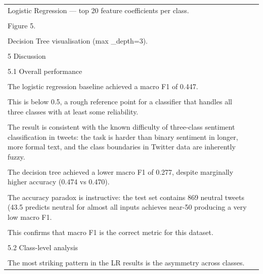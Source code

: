 \documentclass[11pt]{article}
\begin{document}
\begin{longtable}{|p{}|p{}|}
\hline
\rule{0pt}{3.5cm} & \\
\hline
Logistic Regression --- top 20 feature coefficients per class. & \\[2pt]
\hline
\rule{0pt}{3.5cm} & \\
\hline
Figure 5. & \\[2pt]
\hline
\rule{0pt}{3.5cm} & \\
\hline
Decision Tree visualisation (max \_depth=3). & \\[2pt]
\hline
\rule{0pt}{3.5cm} & \\
\hline
5 Discussion & \\[2pt]
\hline
\rule{0pt}{3.5cm} & \\
\hline
5.1 Overall performance & \\[2pt]
\hline
\rule{0pt}{3.5cm} & \\
\hline
The logistic regression baseline achieved a macro F1 of 0.447. & \\[2pt]
\hline
\rule{0pt}{3.5cm} & \\
\hline
This is below 0.5, a rough reference point for a classifier that handles all three classes with at least some reliability. & \\[2pt]
\hline
\rule{0pt}{3.5cm} & \\
\hline
The result is consistent with the known difficulty of three-class sentiment classification in tweets: the task is harder than binary sentiment in longer, more formal text, and the class boundaries in Twitter data are inherently fuzzy. & \\[2pt]
\hline
\rule{0pt}{3.5cm} & \\
\hline
The decision tree achieved a lower macro F1 of 0.277, despite marginally higher accuracy (0.474 vs 0.470). & \\[2pt]
\hline
\rule{0pt}{3.5cm} & \\
\hline
The accuracy paradox is instructive: the test set contains 869 neutral tweets (43.5 predicts neutral for almost all inputs achieves near-50 producing a very low macro F1. & \\[2pt]
\hline
\rule{0pt}{3.5cm} & \\
\hline
This confirms that macro F1 is the correct metric for this dataset. & \\[2pt]
\hline
\rule{0pt}{3.5cm} & \\
\hline
5.2 Class-level analysis & \\[2pt]
\hline
\rule{0pt}{3.5cm} & \\
\hline
The most striking pattern in the LR results is the asymmetry across classes. & \\[2pt]

\end{longtable}
\end{document}
